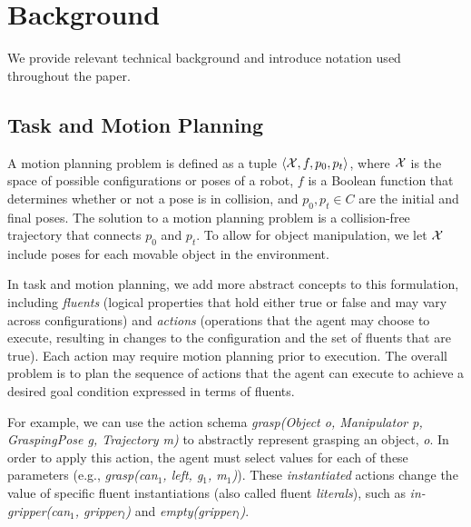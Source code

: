 \section{Background}
We provide relevant technical background and introduce notation
used throughout the paper. 

\subsection{Task and Motion Planning}

A motion planning problem is defined as a tuple $\langle \mathcal{X}, f, p_0,
  p_t \rangle$, where $\mathcal{X}$ is the space of possible configurations or poses
of a robot, $f$ is a Boolean function that determines whether or not a
pose is in collision, and $p_0, p_t\in C$ are the initial and final
poses. The solution to a motion planning problem is a collision-free trajectory that
connects $p_0$ and $p_t$. To allow for object
manipulation, we let $\mathcal{X}$ include poses for each movable object in the
environment. 

In task and motion planning, we add more abstract concepts to this
formulation, including \emph{fluents} (logical properties that hold either
true or false and may
vary across configurations) and \emph{actions} (operations that the
agent may choose to execute, resulting in changes to the configuration
and the set of fluents that are true). Each action may require motion
planning prior to execution.  The overall problem is to plan the
sequence of actions that the agent can execute to achieve a
desired goal condition expressed in terms of fluents.

For example, we can use the action schema \emph{grasp(Object o,
  Manipulator p, GraspingPose g, Trajectory m)} to abstractly
represent grasping an object, \emph{o}.  In order to apply this action,
the agent must select values for each of these parameters (e.g.,
\emph{grasp(can$_1$, left, g$_1$, m$_1$)}). These \emph{instantiated}
actions change the value of specific fluent instantiations (also
called fluent \emph{literals}), such as \emph{in-gripper(can$_1$, gripper$_l$)}
and \emph{empty(gripper$_l$)}.

